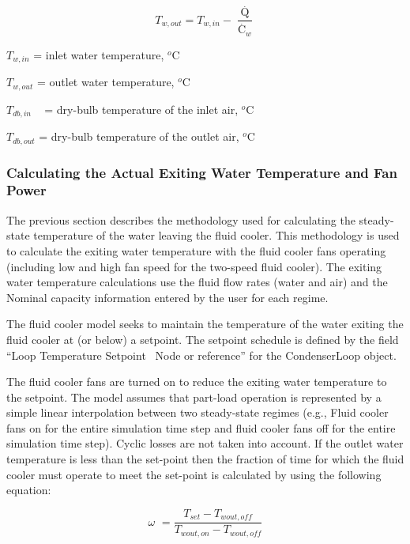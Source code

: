 \begin{equation}
{T_{w,out}} = {T_{w,in}} - \frac{{\mathop Q\limits^. }}{{{{\mathop C\limits^. }_w}}}
\end{equation}

\({T_{w,in}}\) = inlet water temperature, \(^{o}\)C

\({T_{w,out}}\) = outlet water temperature, \(^{o}\)C

\({T_{db,in}}\) ~ = dry-bulb temperature of the inlet air, \(^{o}\)C

\({T_{db,out}}\) = dry-bulb temperature of the outlet air, \(^{o}\)C

\subsubsection{Calculating the Actual Exiting Water Temperature and Fan Power}\label{calculating-the-actual-exiting-water-temperature-and-fan-power-1}

The previous section describes the methodology used for calculating the steady-state temperature of the water leaving the fluid cooler. This methodology is used to calculate the exiting water temperature with the fluid cooler fans operating (including low and high fan speed for the two-speed fluid cooler). The exiting water temperature calculations use the fluid flow rates (water and air) and the Nominal capacity information entered by the user for each regime.

The fluid cooler model seeks to maintain the temperature of the water exiting the fluid cooler at (or below) a setpoint. The setpoint schedule is defined by the field ``Loop Temperature Setpoint~ Node or reference'' for the CondenserLoop object.

The fluid cooler fans are turned on to reduce the exiting water temperature to the setpoint. The model assumes that part-load operation is represented by a simple linear interpolation between two steady-state regimes (e.g., Fluid cooler fans on for the entire simulation time step and fluid cooler fans off for the entire simulation time step). Cyclic losses are not taken into account. If the outlet water temperature is less than the set-point then the fraction of time for which the fluid cooler must operate to meet the set-point is calculated by using the following equation:

\begin{equation}
\omega \,\, = \frac{{{T_{set}} - {T_{wout,off}}}}{{{T_{wout,on}} - {T_{wout,off}}}}
\end{equation}


